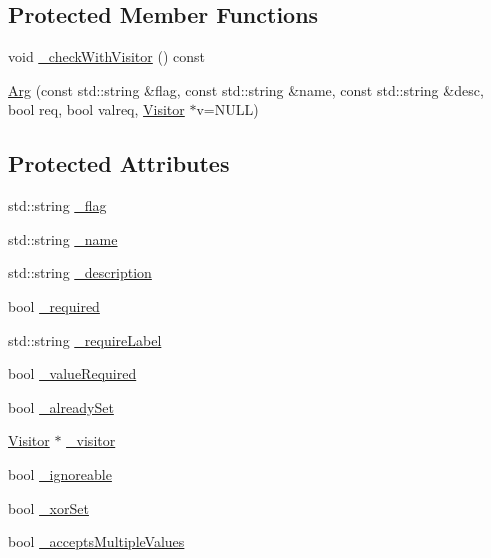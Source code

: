 \subsection*{Protected Member Functions}
\begin{DoxyCompactItemize}
\item 
void \hyperlink{class_t_c_l_a_p_1_1_arg_aa963d0d4c8cb297e1f4cf74143bf6d1b}{\+\_\+check\+With\+Visitor} () const 
\item 
\hyperlink{class_t_c_l_a_p_1_1_arg_ab25a06db5edf82a5b965b641b3c63372}{Arg} (const std\+::string \&flag, const std\+::string \&name, const std\+::string \&desc, bool req, bool valreq, \hyperlink{class_t_c_l_a_p_1_1_visitor}{Visitor} $\ast$v=N\+U\+L\+L)
\end{DoxyCompactItemize}
\subsection*{Protected Attributes}
\begin{DoxyCompactItemize}
\item 
std\+::string \hyperlink{class_t_c_l_a_p_1_1_arg_ae68407a0a8223023ad0ae3b9dc7986f5}{\+\_\+flag}
\item 
std\+::string \hyperlink{class_t_c_l_a_p_1_1_arg_ac0f138057a99fb5d94ff4acb41a083aa}{\+\_\+name}
\item 
std\+::string \hyperlink{class_t_c_l_a_p_1_1_arg_a9882fe256eaab01ac53db54ac657d272}{\+\_\+description}
\item 
bool \hyperlink{class_t_c_l_a_p_1_1_arg_ad16408bd1ca4d8b1d14d6c5129545a84}{\+\_\+required}
\item 
std\+::string \hyperlink{class_t_c_l_a_p_1_1_arg_a2ed097a868e34a0c4f6062ead744ac54}{\+\_\+require\+Label}
\item 
bool \hyperlink{class_t_c_l_a_p_1_1_arg_a776682b7e19f4dc231bbad3d10034dfa}{\+\_\+value\+Required}
\item 
bool \hyperlink{class_t_c_l_a_p_1_1_arg_a829e32129857d2683e5791a5df1208ec}{\+\_\+already\+Set}
\item 
\hyperlink{class_t_c_l_a_p_1_1_visitor}{Visitor} $\ast$ \hyperlink{class_t_c_l_a_p_1_1_arg_aa9ff037e92c9fa5bd85e532f61899300}{\+\_\+visitor}
\item 
bool \hyperlink{class_t_c_l_a_p_1_1_arg_a9832bb7564f4ab472bd51b7b1bbc683f}{\+\_\+ignoreable}
\item 
bool \hyperlink{class_t_c_l_a_p_1_1_arg_ab413bd1d8a7ecf3c89672ee23ef791ba}{\+\_\+xor\+Set}
\item 
bool \hyperlink{class_t_c_l_a_p_1_1_arg_a13130a9a5d22c57a6d42a8883c9b1e0f}{\+\_\+accepts\+Multiple\+Values}
\end{DoxyCompactItemize}


